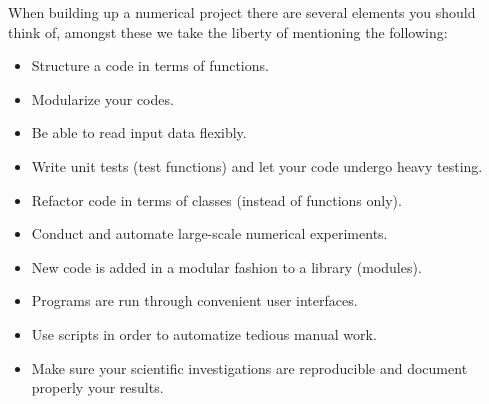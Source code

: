 When building up a numerical project there are several elements you should think of, amongst these we take the liberty of mentioning the following:
\begin{itemize}
\item Structure a code in terms of functions.
\item Modularize your codes.
\item Be able to  read input data flexibly.
\item Write unit tests (test functions) and let your code undergo heavy testing.
\item Refactor code in terms of classes (instead of functions only).
\item Conduct and automate large-scale numerical experiments.
\item New code is added in a modular fashion to a library (modules).
\item Programs are run through convenient user interfaces.
\item Use scripts in order to automatize  tedious manual work.
\item Make sure your scientific investigations are reproducible and document properly your results.
\end{itemize}


